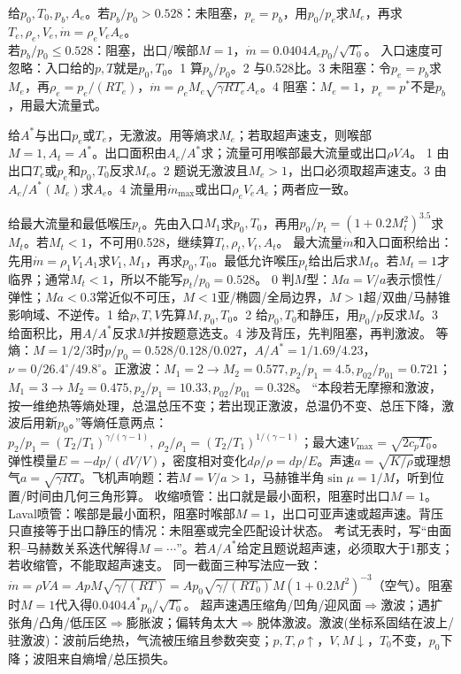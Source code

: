 给$p_0,T_0,p_b,A_e$。若$p_b/p_0>0.528$：未阻塞，$p_e=p_b$，用$p_0/p_e$求$M_e$，再求$T_e,\rho_e,V_e,\dot m=\rho_eV_eA_e$。\\
若$p_b/p_0\le0.528$：阻塞，出口/喉部$M=1$，$\dot m=0.0404A_ep_0/\sqrt{T_0}$。
入口速度可忽略：入口给的$p,T$就是$p_0,T_0$。1 算$p_b/p_0$。2 与0.528比。3 未阻塞：令$p_e=p_b$求$M_e$，再$\rho_e=p_e/(RT_e)$，$\dot m=\rho_eM_e\sqrt{\gamma RT_e}A_e$。4 阻塞：$M_e=1$，$p_e=p^*$不是$p_b$，用最大流量式。

给$A^*$与出口$p_e$或$T_e$，无激波。用等熵求$M_e$；若取超声速支，则喉部$M=1,A_t=A^*$。出口面积由$A_e/A^*$求；流量可用喉部最大流量或出口$\rho VA$。
1 由出口$T_e$或$p_e$和$p_0,T_0$反求$M_e$。2 题说无激波且$M_e>1$，出口必须取超声速支。3 由$A_e/A^*(M_e)$求$A_e$。4 流量用$\dot m_{\max}$或出口$\rho_eV_eA_e$；两者应一致。

给最大流量和最低喉压$p_t$。先由入口$M_1$求$p_0,T_0$，再用$p_0/p_t=(1+0.2M_t^2)^{3.5}$求$M_t$。若$M_t<1$，不可用0.528，继续算$T_t,\rho_t,V_t,A_t$。
最大流量$\dot m$和入口面积给出：先用$\dot m=\rho_1V_1A_1$求$V_1,M_1$，再求$p_0,T_0$。最低允许喉压$p_t$给出后求$M_t$。若$M_t=1$才临界；通常$M_t<1$，所以不能写$p_t/p_0=0.528$。
0 判$M$型：$Ma=V/a$表示惯性/弹性；$Ma<0.3$常近似不可压，$M<1$亚/椭圆/全局边界，$M>1$超/双曲/马赫锥影响域、不逆传。1 给$p,T,V$先算$M,p_0,T_0$。2 给$p_0,T_0$和静压，用$p_0/p$反求$M$。3 给面积比，用$A/A^*$反求$M$并按题意选支。4 涉及背压，先判阻塞，再判激波。
等熵：$M=1/2/3$时$p/p_0=0.528/0.128/0.027$，$A/A^*=1/1.69/4.23$，$\nu=0/26.4^\circ/49.8^\circ$。正激波：$M_1=2\to M_2=0.577,p_2/p_1=4.5,p_{02}/p_{01}=0.721$；$M_1=3\to M_2=0.475,p_2/p_1=10.33,p_{02}/p_{01}=0.328$。
“本段若无摩擦和激波，按一维绝热等熵处理，总温总压不变；若出现正激波，总温仍不变、总压下降，激波后用新$p_0$。”等熵任意两点：$p_2/p_1=(T_2/T_1)^{\gamma/(\gamma-1)},\ \rho_2/\rho_1=(T_2/T_1)^{1/(\gamma-1)}$；最大速$V_{\max}=\sqrt{2c_pT_0}$。
弹性模量$E=-dp/(dV/V)$，密度相对变化$d\rho/\rho=dp/E$。声速$a=\sqrt{K/\rho}$或理想气$a=\sqrt{\gamma RT}$。飞机声响题：若$M=V/a>1$，马赫锥半角$\sin\mu=1/M$，听到位置/时间由几何三角形算。
收缩喷管：出口就是最小面积，阻塞时出口$M=1$。Laval喷管：喉部是最小面积，阻塞时喉部$M=1$，出口可亚声速或超声速。背压只直接等于出口静压的情况：未阻塞或完全匹配设计状态。
考试无表时，写“由面积--马赫数关系迭代解得$M=\cdots$”。若$A/A^*$给定且题说超声速，必须取大于1那支；若收缩管，不能取超声速支。
同一截面三种写法应一致：$\dot m=\rho VA=ApM\sqrt{\gamma/(RT)}=A p_0\sqrt{\gamma/(RT_0)}M(1+0.2M^2)^{-3}$（空气）。阻塞时$M=1$代入得$0.0404A^*p_0/\sqrt{T_0}$。
\schemeshock
{}
超声速遇压缩角/凹角/迎风面$\Rightarrow$激波；遇扩张角/凸角/低压区$\Rightarrow$膨胀波；偏转角太大$\Rightarrow$脱体激波。激波(坐标系固结在波上/驻激波)：波前后绝热，气流被压缩且参数突变；$p,T,\rho\uparrow$，$V,M\downarrow$，$T_0$不变，$p_0$下降；波阻来自熵增/总压损失。


